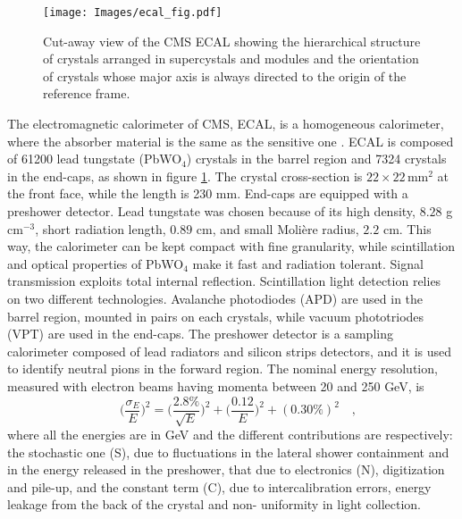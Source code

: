 \begin{figure}
\centering
\texttt{[image: Images/ecal\_fig.pdf]}
\caption{Cut-away view of the CMS ECAL showing the hierarchical structure
of crystals arranged in supercystals and modules and the orientation of crystals
whose major axis is always directed to the origin of the reference frame.}
\label{ecal_fig}
\end{figure}
The electromagnetic calorimeter of CMS, ECAL, is a homogeneous calorimeter, 
where the absorber material is the same as the sensitive one \cite{ECA}. ECAL
is composed of 61200 lead tungstate (PbWO$_4$) crystals in the barrel region and
7324 crystals in the end-caps, as shown in figure \ref{ecal_fig}. The crystal cross-section is
$22\times22\,\mathrm{mm}^2$ at the front face, while the length is 230 mm. End-caps are equipped
with a preshower detector. Lead tungstate was chosen because of its high density, $8.28$
g cm$^{-3}$, short radiation length, $0.89$ cm, and small Molière radius, $2.2$ cm. This way,
the calorimeter can be kept compact with fine granularity, while scintillation and
optical properties of PbWO$_4$ make it fast and radiation tolerant. Signal transmission 
exploits total internal reflection. Scintillation light detection relies on two
different technologies. Avalanche photodiodes (APD) are used in the barrel region,
mounted in pairs on each crystals, while vacuum phototriodes (VPT) are used in
the end-caps. The preshower detector is a sampling calorimeter composed of lead
radiators and silicon strips detectors, and it is used to identify neutral pions in
the forward region. The nominal energy resolution, measured with electron beams
having momenta between 20 and 250 GeV, is
\begin{displaymath}\quad
\bigg(\frac{\sigma_E}{E}\bigg)^2=\Bigg(\frac{2.8\%}{\sqrt{E}}\Bigg)^2+\Bigg(\frac{0.12}{E}\Bigg)^2+(0.30\%)^2 \quad,
\end{displaymath}
where all the energies are in GeV and the different contributions are respectively: the stochastic one (S), due to fluctuations 
in the lateral shower containment and in the energy released in the
preshower, that due to electronics (N), digitization and pile-up, and the constant term (C),
due to intercalibration errors, energy leakage from the back of the crystal and non-
uniformity in light collection.
\\

